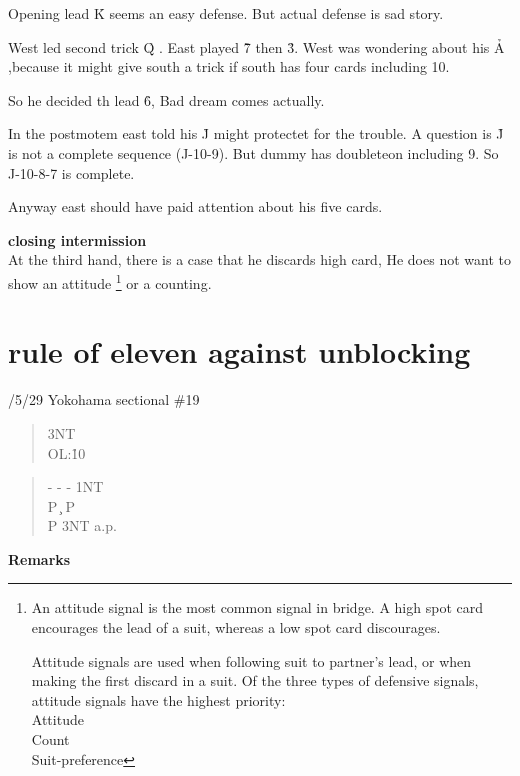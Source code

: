 Opening lead \h K seems an easy defense. But
actual defense is sad story.

West led second trick \h Q . East played \h 7 then
\h 3. West was wondering about his \h A ,because it might give 
south a trick if south has four cards including 10.

So he decided th lead \h 6, Bad dream comes actually.

In the postmotem east told his \h J might protectet
for the trouble. A question is  \h J is not a complete 
sequence (J-10-9). But dummy has doubleteon including 9.
So J-10-8-7 is complete. 

Anyway east should have paid attention about his 
five cards.

{\bf closing intermission}\\

At the third hand, there is a case that he discards high 
card, He  does not want to show an attitude \footnote{
An attitude signal is the most common signal in bridge. A high spot card encourages the lead of a suit, whereas a low spot card discourages.

Attitude signals are used when following suit to partner's lead, or when making the first discard in a suit. Of the three types of defensive signals, attitude
 signals have the highest priority:\\
Attitude\\
Count\\
Suit-preference} or a counting.
\section{rule of eleven against unblocking}

/5/29 Yokohama sectional \#19
\begin{quote}
  {\begin{minipage}[t]{\br}
     3NT\\OL:\h 10
  \end{minipage}}%
  {}%
  {}
  {}%
  {}%
\end{quote}
\begin{quote}
\begin{bidding}
- \> -  \> - \> 1NT  \\
P \c \> P \d\\
P \> 3NT \> a.p.
\end{bidding}
\end{quote}
{\bf Remarks}\\

